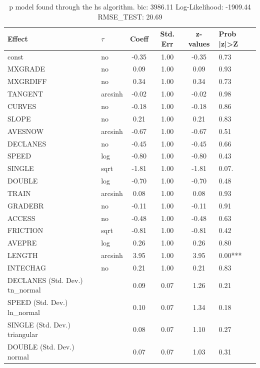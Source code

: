 \begin{table}
	\caption{p model found through the hs algorithm. bic: 3986.11 Log-Likelihood: -1909.44 RMSE_TEST: 20.69}
	\begin{center}
		\begin{tabular}{|l|l|c|c|c|l|}
			\hline
			Effect & $\tau$ & Coeff & Std. Err & z-values & Prob |z|>Z \\
			\hline
			const & no & -0.35 & 1.00 & -0.35 & 0.73 \\
			\hline
			MXGRADE & no & 0.09 & 1.00 & 0.09 & 0.93 \\
			\hline
			MXGRDIFF & no & 0.34 & 1.00 & 0.34 & 0.73 \\
			\hline
			TANGENT & arcsinh & -0.02 & 1.00 & -0.02 & 0.98 \\
			\hline
			CURVES & no & -0.18 & 1.00 & -0.18 & 0.86 \\
			\hline
			SLOPE & no & 0.21 & 1.00 & 0.21 & 0.83 \\
			\hline
			AVESNOW & arcsinh & -0.67 & 1.00 & -0.67 & 0.51 \\
			\hline
			DECLANES & no & -0.45 & 1.00 & -0.45 & 0.66 \\
			\hline
			SPEED & log & -0.80 & 1.00 & -0.80 & 0.43 \\
			\hline
			SINGLE & sqrt & -1.81 & 1.00 & -1.81 & 0.07. \\
			\hline
			DOUBLE & log & -0.70 & 1.00 & -0.70 & 0.48 \\
			\hline
			TRAIN & arcsinh & 0.08 & 1.00 & 0.08 & 0.93 \\
			\hline
			GRADEBR & no & -0.11 & 1.00 & -0.11 & 0.91 \\
			\hline
			ACCESS & no & -0.48 & 1.00 & -0.48 & 0.63 \\
			\hline
			FRICTION & sqrt & -0.81 & 1.00 & -0.81 & 0.42 \\
			\hline
			AVEPRE & log & 0.26 & 1.00 & 0.26 & 0.80 \\
			\hline
			LENGTH & arcsinh & 3.95 & 1.00 & 3.95 & 0.00*** \\
			\hline
			INTECHAG & no & 0.21 & 1.00 & 0.21 & 0.83 \\
			\hline
			DECLANES (Std. Dev.) tn_normal &  & 0.09 & 0.07 & 1.26 & 0.21 \\
			\hline
			SPEED (Std. Dev.) ln_normal &  & 0.10 & 0.07 & 1.34 & 0.18 \\
			\hline
			SINGLE (Std. Dev.) triangular &  & 0.08 & 0.07 & 1.10 & 0.27 \\
			\hline
			DOUBLE (Std. Dev.) normal &  & 0.07 & 0.07 & 1.03 & 0.31 \\

\end{tabular}
\end{center}
\end{table}
